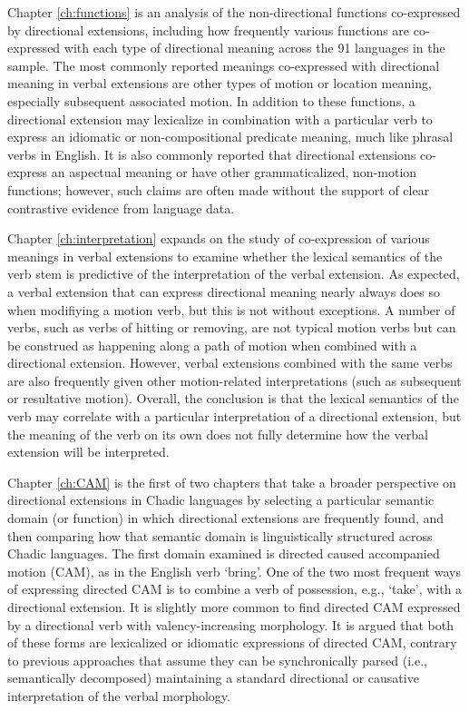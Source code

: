 Chapter \ref{ch:functions} is an analysis of the non-directional functions co-expressed by directional extensions, including how frequently various functions are co-expressed with each type of directional meaning across the 91 languages in the sample. The most commonly reported meanings co-expressed with directional meaning in verbal extensions are other types of motion or location meaning, especially subsequent associated motion. In addition to these functions, a directional extension may lexicalize in combination with a particular verb to express an idiomatic or non-compositional predicate meaning, much like phrasal verbs in English. It is also commonly reported that directional extensions co-express an aspectual meaning or have other grammaticalized, non-motion functions; however, such claims are often made without the support of clear contrastive evidence from language data.  

Chapter \ref{ch:interpretation} expands on the study of co-expression of various meanings in verbal extensions to examine whether the lexical semantics of the verb stem is predictive of the interpretation of the verbal extension. As expected, a verbal extension that can express directional meaning nearly always does so when modifiying a motion verb, but this is not without exceptions. A number of verbs, such as verbs of hitting or removing, are not typical motion verbs but can be construed as happening along a path of motion when combined with a directional extension. However, verbal extensions combined with the same verbs are also frequently given other motion-related interpretations (such as subsequent or resultative motion). Overall, the conclusion is that the lexical semantics of the verb may correlate with a particular interpretation of a directional extension, but the meaning of the verb on its own does not fully determine how the verbal extension will be interpreted. 

Chapter \ref{ch:CAM} is the first of two chapters that take a broader perspective on directional extensions in Chadic languages by selecting a particular semantic domain (or function) in which directional extensions are frequently found, and then comparing how that semantic domain is linguistically structured across Chadic languages. The first domain examined is directed caused accompanied motion (CAM), as in the English verb `bring'. One of the two most frequent ways of expressing directed CAM is to combine a verb of possession, e.g., `take', with a directional extension. It is slightly more common to find directed CAM expressed by a directional verb with valency-increasing morphology. It is argued that both of these forms are lexicalized or idiomatic expressions of directed CAM, contrary to previous approaches that assume they can be synchronically parsed (i.e., semantically decomposed) maintaining a standard directional or causative interpretation of the verbal morphology. 

